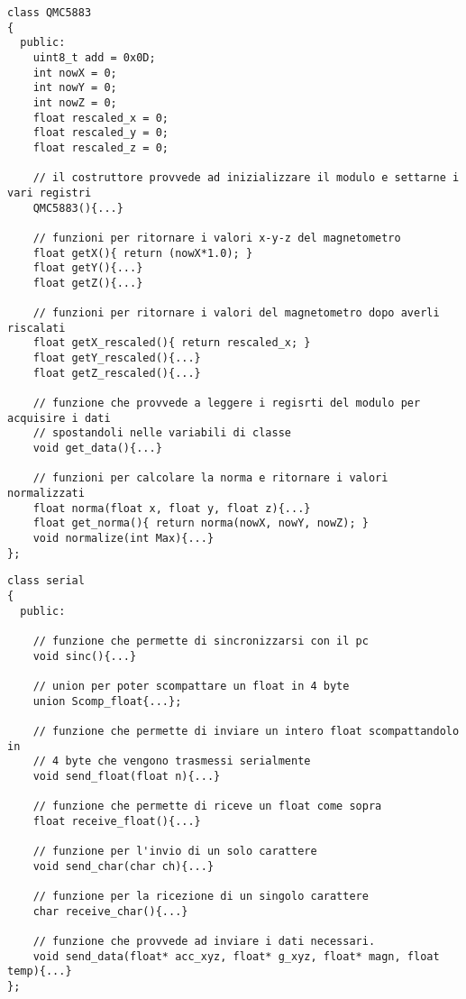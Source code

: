 \documentclass[10pt,a4paper]{article}
\begin{document}
\begin{lstlisting}[style=myArduino, caption=classe "QMC5883", captionpos=b]
class QMC5883
{
  public:
    uint8_t add = 0x0D;
    int nowX = 0;
    int nowY = 0;
    int nowZ = 0;
    float rescaled_x = 0; 
    float rescaled_y = 0;
    float rescaled_z = 0;
    
    // il costruttore provvede ad inizializzare il modulo e settarne i vari registri 
    QMC5883(){...}
    
    // funzioni per ritornare i valori x-y-z del magnetometro
    float getX(){ return (nowX*1.0); }
    float getY(){...}
    float getZ(){...}

    // funzioni per ritornare i valori del magnetometro dopo averli riscalati
    float getX_rescaled(){ return rescaled_x; }
    float getY_rescaled(){...}
    float getZ_rescaled(){...}
  
    // funzione che provvede a leggere i regisrti del modulo per acquisire i dati
    // spostandoli nelle variabili di classe
    void get_data(){...}

    // funzioni per calcolare la norma e ritornare i valori normalizzati 
    float norma(float x, float y, float z){...}
    float get_norma(){ return norma(nowX, nowY, nowZ); }
    void normalize(int Max){...}
};
\end{lstlisting}
\begin{lstlisting}[style=myArduino, caption=classe "serial", captionpos=b]
class serial
{
  public:

    // funzione che permette di sincronizzarsi con il pc
    void sinc(){...}

    // union per poter scompattare un float in 4 byte
    union Scomp_float{...};

    // funzione che permette di inviare un intero float scompattandolo in 
    // 4 byte che vengono trasmessi serialmente
    void send_float(float n){...}

    // funzione che permette di riceve un float come sopra
    float receive_float(){...}

    // funzione per l'invio di un solo carattere
    void send_char(char ch){...}

    // funzione per la ricezione di un singolo carattere
    char receive_char(){...}

    // funzione che provvede ad inviare i dati necessari.
    void send_data(float* acc_xyz, float* g_xyz, float* magn, float temp){...} 
};
\end{lstlisting}
\end{document}
